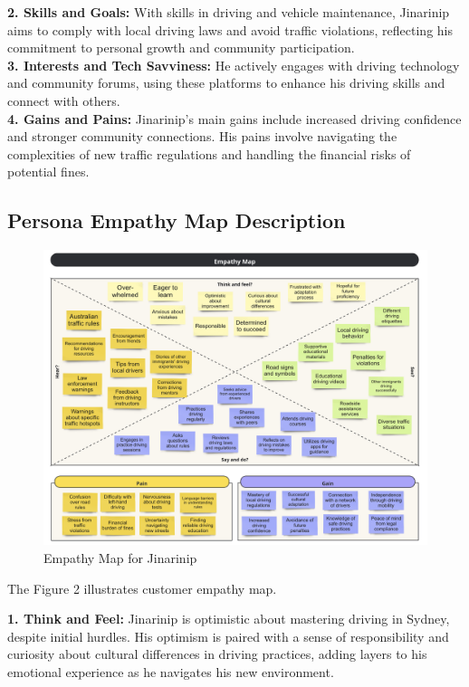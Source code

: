 \documentclass[12pt,a4paper]{article}
\begin{document}
\noindent\textbf{2. Skills and Goals:} With skills in driving and vehicle maintenance, Jinarinip aims to comply with local driving laws and avoid traffic violations, reflecting his commitment to personal growth and community participation.\\

\noindent\textbf{3. Interests and Tech Savviness:} He actively engages with driving technology and community forums, using these platforms to enhance his driving skills and connect with others.\\

\noindent\noindent\textbf{4. Gains and Pains:} Jinarinip's main gains include increased driving confidence and stronger community connections. His pains involve navigating the complexities of new traffic regulations and handling the financial risks of potential fines.


\label{sec:Question 3}
\subsection{Persona Empathy Map Description}

\begin{figure}[h]
  \centering
  \includegraphics[width=1.0\textwidth]{images/EmpathyMap.png}
  \caption{Empathy Map for Jinarinip}
  \label{fig:empathy-map}
\end{figure}

\noindent The Figure 2 illustrates customer empathy map.

\noindent\textbf{1. Think and Feel:} Jinarinip is optimistic about mastering driving in Sydney, despite initial hurdles. His optimism is paired with a sense of responsibility and curiosity about cultural differences in driving practices, adding layers to his emotional experience as he navigates his new environment.\\
\end{document}
